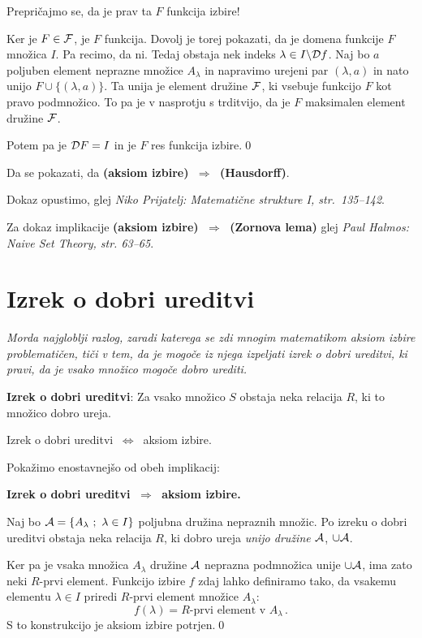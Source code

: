 \documentclass[11pt,paper=b5,DIV=13,headinclude,footinclude]{scrbook}
\def\sledi {{~\Rightarrow~}}
\def\cee {{~\Leftrightarrow~}}
\begin{document}
Prepričajmo se, da je prav ta $F$ funkcija izbire!

Ker je $F\in{\cal F}$, je $F$ funkcija. Dovolj je torej pokazati, da je domena funkcije $F$ množica $I$. Pa recimo, da ni. Tedaj obstaja nek indeks $\lambda\in I\backslash {\cal D}f$. Naj bo $a$ poljuben element neprazne množice $A_\lambda$ in napravimo urejeni par $(\lambda, a)$ in nato unijo $F\cup\{(\lambda,a)\}$. Ta unija je element družine ${\cal F}$, ki vsebuje funkcijo $F$ kot pravo podmnožico. To pa je v nasprotju s trditvijo, da je $F$ maksimalen element družine ${\cal F}$.

Potem pa je ${\cal D}F = I$ in je $F$ res funkcija izbire.\qed

\bigskip

Da se pokazati, da \textbf{(aksiom izbire) $\sledi$ (Hausdorff)}.

Dokaz opustimo, glej \emph{ Niko Prijatelj: Matemati\v cne strukture I, str.~135--142}.

Za dokaz implikacije \textbf{(aksiom izbire) $\sledi$ (Zornova lema)}
glej \emph{ Paul Halmos: Naive Set Theory, str. 63--65}.

\section{Izrek o dobri ureditvi}

\emph{ Morda najgloblji razlog, zaradi katerega se zdi mnogim matematikom aksiom izbire problematičen,
tiči v tem, da je mogoče iz njega izpeljati izrek o dobri ureditvi, ki pravi, da je vsako
množico mogoče dobro urediti.}


\medskip
\textbf{Izrek o dobri ureditvi}: Za vsako množico $S$ obstaja neka relacija $R$, ki to množico dobro ureja.

\bigskip
Izrek o dobri ureditvi $\cee$ aksiom izbire.

\bigskip
Pokažimo enostavnejšo  od obeh implikacij:

\textbf{Izrek o dobri ureditvi $\sledi$ aksiom izbire.}

Naj bo ${\cal A} = \{A_\lambda~;~\lambda\in I\}$ poljubna družina nepraznih množic.
Po izreku o dobri ureditvi obstaja neka relacija $R$, ki dobro ureja \emph{ unijo družine ${\cal A}$}, $\cup {\cal A}$.

Ker pa je vsaka množica $A_\lambda$ družine ${\cal A}$ neprazna podmnožica
unije $\cup{\cal A}$, ima zato neki $R$-prvi element.
Funkcijo izbire $f$ zdaj lahko definiramo tako, da vsakemu elementu $\lambda\in I$ priredi
$R$-prvi element množice $A_\lambda$:
$$f(\lambda) = R\textrm{-prvi element v }A_\lambda\,.$$
S to konstrukcijo je aksiom izbire potrjen.\qed
\end{document}
